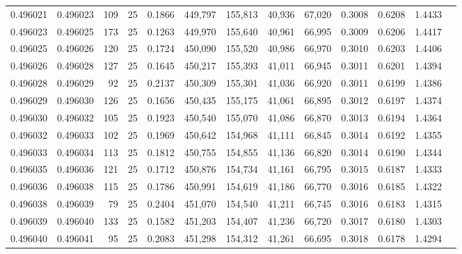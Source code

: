 \begin{tabular}{rrrrrrrrrrrrr}
0.496021 & 0.496023 &   109 &  25 &                                     0.1866 & 449,797 & 155,813 &  40,936 &  67,020 & 0.3008 & 0.6208 & 1.4433 \\
0.496023 & 0.496025 &   173 &  25 &                                     0.1263 & 449,970 & 155,640 &  40,961 &  66,995 & 0.3009 & 0.6206 & 1.4417 \\
0.496025 & 0.496026 &   120 &  25 &                                     0.1724 & 450,090 & 155,520 &  40,986 &  66,970 & 0.3010 & 0.6203 & 1.4406 \\
0.496026 & 0.496028 &   127 &  25 &                                     0.1645 & 450,217 & 155,393 &  41,011 &  66,945 & 0.3011 & 0.6201 & 1.4394 \\
0.496028 & 0.496029 &    92 &  25 &                                     0.2137 & 450,309 & 155,301 &  41,036 &  66,920 & 0.3011 & 0.6199 & 1.4386 \\
0.496029 & 0.496030 &   126 &  25 &                                     0.1656 & 450,435 & 155,175 &  41,061 &  66,895 & 0.3012 & 0.6197 & 1.4374 \\
0.496030 & 0.496032 &   105 &  25 &                                     0.1923 & 450,540 & 155,070 &  41,086 &  66,870 & 0.3013 & 0.6194 & 1.4364 \\
0.496032 & 0.496033 &   102 &  25 &                                     0.1969 & 450,642 & 154,968 &  41,111 &  66,845 & 0.3014 & 0.6192 & 1.4355 \\
0.496033 & 0.496034 &   113 &  25 &                                     0.1812 & 450,755 & 154,855 &  41,136 &  66,820 & 0.3014 & 0.6190 & 1.4344 \\
0.496035 & 0.496036 &   121 &  25 &                                     0.1712 & 450,876 & 154,734 &  41,161 &  66,795 & 0.3015 & 0.6187 & 1.4333 \\
0.496036 & 0.496038 &   115 &  25 &                                     0.1786 & 450,991 & 154,619 &  41,186 &  66,770 & 0.3016 & 0.6185 & 1.4322 \\
0.496038 & 0.496039 &    79 &  25 &                                     0.2404 & 451,070 & 154,540 &  41,211 &  66,745 & 0.3016 & 0.6183 & 1.4315 \\
0.496039 & 0.496040 &   133 &  25 &                                     0.1582 & 451,203 & 154,407 &  41,236 &  66,720 & 0.3017 & 0.6180 & 1.4303 \\
0.496040 & 0.496041 &    95 &  25 &                                     0.2083 & 451,298 & 154,312 &  41,261 &  66,695 & 0.3018 & 0.6178 & 1.4294 \\

\end{tabular}
